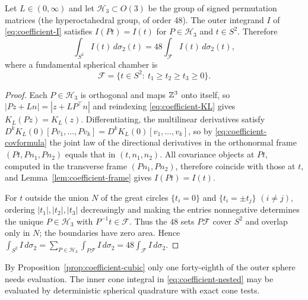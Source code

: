 \begin{proposition}\label{prop:coefficient-cubic}
Let $L\in(0,\infty)$ and let $\mathcal H_3\subset O(3)$ be the group of signed permutation matrices (the hyperoctahedral group, of order $48$). The outer integrand $I$ of \eqref{eq:coefficient-I} satisfies $I(Pt)=I(t)$ for $P\in\mathcal H_3$ and $t\in S^2$. Therefore
\begin{equation}\label{eq:coefficient-48}
\int_{S^2}I(t)\,d\sigma_2(t)=48\int_{\mathcal F}I(t)\,d\sigma_2(t),
\end{equation}
where a fundamental spherical chamber is
\begin{equation}\label{eq:coefficient-chamber}
\mathcal F=\{t\in S^2:\ t_1\ge t_2\ge t_3\ge0\}.
\end{equation}
\end{proposition}

\begin{proof}
Each $P\in\mathcal H_3$ is orthogonal and maps $\mathbb Z^3$ onto itself, so $|Pz+Ln|=|z+LP^{\top}n|$ and reindexing \eqref{eq:coefficient-KL} gives $K_L(Pz)=K_L(z)$. Differentiating, the multilinear derivatives satisfy $D^kK_L(0)[Pv_1,\dots,Pv_k]=D^kK_L(0)[v_1,\dots,v_k]$, so by \eqref{eq:coefficient-covformula} the joint law of the directional derivatives in the orthonormal frame $(Pt,Pn_1,Pn_2)$ equals that in $(t,n_1,n_2)$. All covariance objects at $Pt$, computed in the transverse frame $(Pn_1,Pn_2)$, therefore coincide with those at $t$, and Lemma~\ref{lem:coefficient-frame} gives $I(Pt)=I(t)$.

For $t$ outside the union $N$ of the great circles $\{t_i=0\}$ and $\{t_i=\pm t_j\}$ $(i\ne j)$, ordering $|t_1|,|t_2|,|t_3|$ decreasingly and making the entries nonnegative determines the unique $P\in\mathcal H_3$ with $P^{-1}t\in\mathcal F$. Thus the $48$ sets $P\mathcal F$ cover $S^2$ and overlap only in $N$; the boundaries have zero area. Hence $\int_{S^2}I\,d\sigma_2=\sum_{P\in\mathcal H_3}\int_{P\mathcal F}I\,d\sigma_2=48\int_{\mathcal F}I\,d\sigma_2$.
\end{proof}

\begin{remark}[quadrature]\label{rem:coefficient-quadrature}
By Proposition~\ref{prop:coefficient-cubic} only one forty-eighth of the outer sphere needs evaluation. The inner cone integral in \eqref{eq:coefficient-nested} may be evaluated by deterministic spherical quadrature with exact cone tests.
\end{remark}

